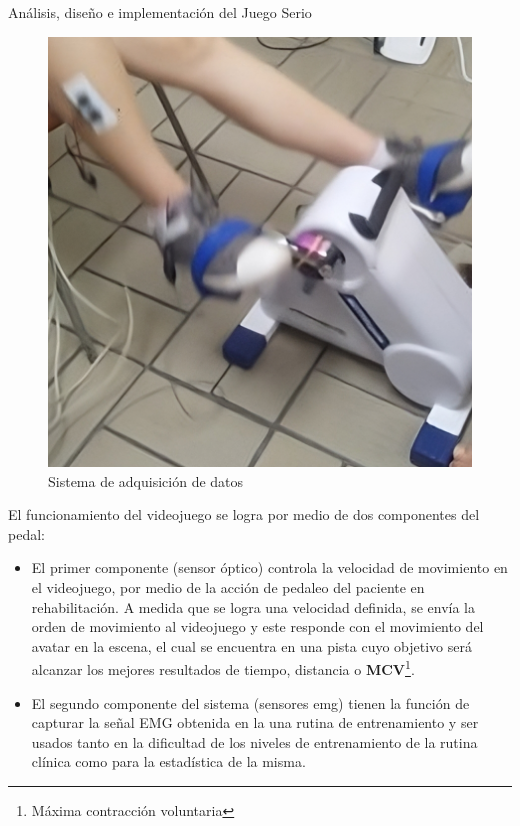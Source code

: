 \begin{thesischapter}{2} {Análisis, diseño e implementación del Juego Serio}
    \begin{figure}[ht]
        \centering
        \includegraphics[scale=0.2]{images/sa.png}
        \caption{Sistema de adquisición de datos}
        \label{fig: sa}
    \end{figure}    

    \vspace{10pt} %
    El funcionamiento del videojuego se logra por medio de dos componentes del pedal:
    \begin{itemize}
        \item El primer componente (sensor óptico) controla la velocidad de movimiento en el videojuego, por
        medio de la acción de pedaleo del paciente en rehabilitación. A medida
        que se logra una velocidad definida, se envía la orden de movimiento al videojuego y 
        este responde con el movimiento del avatar en la escena, el cual se encuentra en una pista 
        cuyo objetivo será alcanzar los mejores resultados de tiempo, distancia o  \textbf{MCV}\footnote{Máxima contracción voluntaria}.
        \item El segundo componente del sistema (sensores emg) tienen la función de capturar la señal EMG obtenida en la 
        una rutina de entrenamiento y ser usados tanto en la dificultad de los niveles de entrenamiento de la rutina clínica como para la 
        estadística de la misma.
    \end{itemize}
    

\end{thesischapter}
